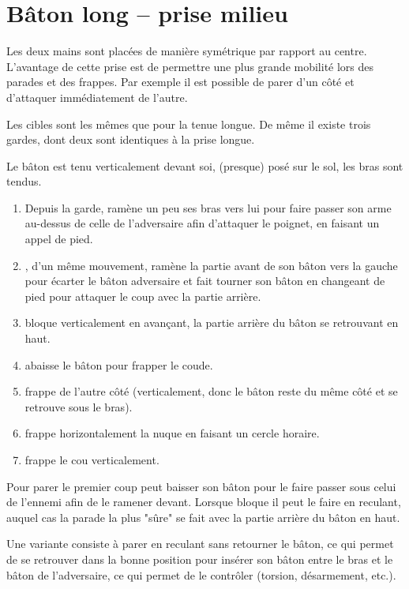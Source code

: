 \chapter{Bâton long -- prise milieu}


Les deux mains sont placées de manière symétrique par rapport au centre.
L'avantage de cette prise est de permettre une plus grande mobilité lors des parades et des frappes.
Par exemple il est possible de parer d'un côté et d'attaquer immédiatement de l'autre.

Les cibles sont les mêmes que pour la tenue longue.
De même il existe trois gardes, dont deux sont identiques à la prise longue.


\begin{garde}

Le bâton est tenu verticalement devant soi, (presque) posé sur le sol, les bras sont tendus.
\end{garde}


\begin{technique}

\begin{enumerate}
	\item Depuis la garde, \A ramène un peu ses bras vers lui pour faire passer son arme au-dessus de celle de l'adversaire afin d'attaquer le poignet, en faisant un appel de pied.
	
	\item \D, d'un même mouvement, ramène la partie avant de son bâton vers la gauche pour écarter le bâton adversaire et fait tourner son bâton en changeant de pied pour attaquer le coup avec la partie arrière.
	
	\item \A bloque verticalement en avançant, la partie arrière du bâton se retrouvant en haut.
	
	\item \A abaisse le bâton pour frapper le coude.
	
	\item \A frappe de l'autre côté (verticalement, donc le bâton reste du même côté et se retrouve sous le bras).
	
	\item \A frappe horizontalement la nuque en faisant un cercle horaire.
	
	\item \A frappe le cou verticalement.
\end{enumerate}

Pour parer le premier coup \D peut baisser son bâton pour le faire passer sous celui de l'ennemi afin de le ramener devant.
Lorsque \A bloque il peut le faire en reculant, auquel cas la parade la plus "sûre" se fait avec la partie arrière du bâton en haut.

Une variante consiste à parer en reculant sans retourner le bâton, ce qui permet de se retrouver dans la bonne position pour insérer son bâton entre le bras et le bâton de l'adversaire, ce qui permet de le contrôler (torsion, désarmement, etc.).
\end{technique}


